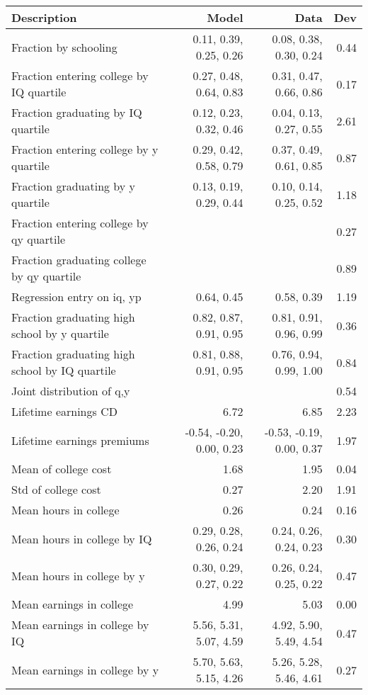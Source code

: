 \begin{tabular}{lrrr}
\hline
Description & Model  & Data  & Dev  \\ 
\hline
Fraction by schooling & 0.11, 0.39, 0.25, 0.26  & 0.08, 0.38, 0.30, 0.24  & 0.44  \\ 
Fraction entering college by IQ quartile & 0.27, 0.48, 0.64, 0.83  & 0.31, 0.47, 0.66, 0.86  & 0.17  \\ 
Fraction graduating by IQ quartile & 0.12, 0.23, 0.32, 0.46  & 0.04, 0.13, 0.27, 0.55  & 2.61  \\ 
Fraction entering college by y quartile & 0.29, 0.42, 0.58, 0.79  & 0.37, 0.49, 0.61, 0.85  & 0.87  \\ 
Fraction graduating by y quartile & 0.13, 0.19, 0.29, 0.44  & 0.10, 0.14, 0.25, 0.52  & 1.18  \\ 
Fraction entering college by qy quartile &   &   & 0.27  \\ 
Fraction graduating college by qy quartile &   &   & 0.89  \\ 
Regression entry on iq, yp & 0.64, 0.45  & 0.58, 0.39  & 1.19  \\ 
Fraction graduating high school by y quartile & 0.82, 0.87, 0.91, 0.95  & 0.81, 0.91, 0.96, 0.99  & 0.36  \\ 
Fraction graduating high school by IQ quartile & 0.81, 0.88, 0.91, 0.95  & 0.76, 0.94, 0.99, 1.00  & 0.84  \\ 
Joint distribution of q,y &   &   & 0.54  \\ 
Lifetime earnings CD & 6.72  & 6.85  & 2.23  \\ 
Lifetime earnings premiums & -0.54, -0.20, 0.00, 0.23  & -0.53, -0.19, 0.00, 0.37  & 1.97  \\ 
Mean of college cost & 1.68  & 1.95  & 0.04  \\ 
Std of college cost & 0.27  & 2.20  & 1.91  \\ 
Mean hours in college & 0.26  & 0.24  & 0.16  \\ 
Mean hours in college by IQ & 0.29, 0.28, 0.26, 0.24  & 0.24, 0.26, 0.24, 0.23  & 0.30  \\ 
Mean hours in college by y & 0.30, 0.29, 0.27, 0.22  & 0.26, 0.24, 0.25, 0.22  & 0.47  \\ 
Mean earnings in college & 4.99  & 5.03  & 0.00  \\ 
Mean earnings in college by IQ & 5.56, 5.31, 5.07, 4.59  & 4.92, 5.90, 5.49, 4.54  & 0.47  \\ 
Mean earnings in college by y & 5.70, 5.63, 5.15, 4.26  & 5.26, 5.28, 5.46, 4.61  & 0.27  \\ 

\end{tabular}
